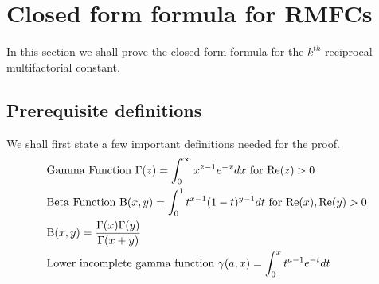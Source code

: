 \documentclass[12pt]{article}
\numberwithin{equation}{section}
\begin{document}

\section{Closed form formula for RMFCs}
In this section we shall prove the closed form formula for the $k^{th}$ reciprocal multifactorial constant.
\subsection{Prerequisite definitions}
We shall first state a few important definitions needed for the proof. \cite{gamma} \cite{beta} \cite{incompletegamma}
\begin{align}
    &\text{Gamma Function } \Gamma (z)=\int_0^{\infty}x^{z-1}e^{-x}dx\text{ for } \text{Re}(z)>0
    \numberwithin{equation}{subsection}\\
    &\text{Beta Function }  \text{B}(x, y)=\int_0^1 t^{x-1}(1-t)^{y-1} dt \text{ for } \text{Re}(x), \text{Re}(y)>0 \\
    &\text{B}(x,y)=\frac{\Gamma(x)\Gamma(y)}{\Gamma(x+y)}\\
    &\text{Lower incomplete gamma function } \gamma (a, x) = \int_0^x t^{a-1} e^{-t} dt
\end{align}
\end{document}
